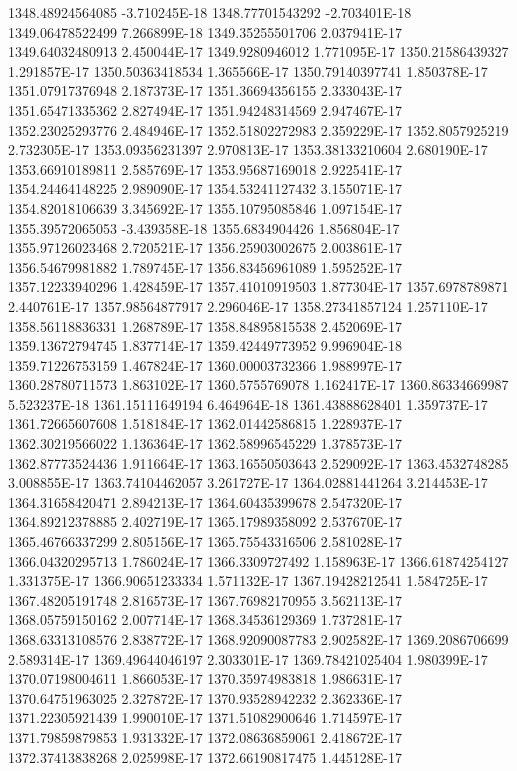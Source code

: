 1348.48924564085  -3.710245E-18
1348.77701543292  -2.703401E-18
1349.06478522499  7.266899E-18
1349.35255501706  2.037941E-17
1349.64032480913  2.450044E-17
1349.9280946012  1.771095E-17
1350.21586439327  1.291857E-17
1350.50363418534  1.365566E-17
1350.79140397741  1.850378E-17
1351.07917376948  2.187373E-17
1351.36694356155  2.333043E-17
1351.65471335362  2.827494E-17
1351.94248314569  2.947467E-17
1352.23025293776  2.484946E-17
1352.51802272983  2.359229E-17
1352.8057925219  2.732305E-17
1353.09356231397  2.970813E-17
1353.38133210604  2.680190E-17
1353.66910189811  2.585769E-17
1353.95687169018  2.922541E-17
1354.24464148225  2.989090E-17
1354.53241127432  3.155071E-17
1354.82018106639  3.345692E-17
1355.10795085846  1.097154E-17
1355.39572065053  -3.439358E-18
1355.6834904426  1.856804E-17
1355.97126023468  2.720521E-17
1356.25903002675  2.003861E-17
1356.54679981882  1.789745E-17
1356.83456961089  1.595252E-17
1357.12233940296  1.428459E-17
1357.41010919503  1.877304E-17
1357.6978789871  2.440761E-17
1357.98564877917  2.296046E-17
1358.27341857124  1.257110E-17
1358.56118836331  1.268789E-17
1358.84895815538  2.452069E-17
1359.13672794745  1.837714E-17
1359.42449773952  9.996904E-18
1359.71226753159  1.467824E-17
1360.00003732366  1.988997E-17
1360.28780711573  1.863102E-17
1360.5755769078  1.162417E-17
1360.86334669987  5.523237E-18
1361.15111649194  6.464964E-18
1361.43888628401  1.359737E-17
1361.72665607608  1.518184E-17
1362.01442586815  1.228937E-17
1362.30219566022  1.136364E-17
1362.58996545229  1.378573E-17
1362.87773524436  1.911664E-17
1363.16550503643  2.529092E-17
1363.4532748285  3.008855E-17
1363.74104462057  3.261727E-17
1364.02881441264  3.214453E-17
1364.31658420471  2.894213E-17
1364.60435399678  2.547320E-17
1364.89212378885  2.402719E-17
1365.17989358092  2.537670E-17
1365.46766337299  2.805156E-17
1365.75543316506  2.581028E-17
1366.04320295713  1.786024E-17
1366.3309727492  1.158963E-17
1366.61874254127  1.331375E-17
1366.90651233334  1.571132E-17
1367.19428212541  1.584725E-17
1367.48205191748  2.816573E-17
1367.76982170955  3.562113E-17
1368.05759150162  2.007714E-17
1368.34536129369  1.737281E-17
1368.63313108576  2.838772E-17
1368.92090087783  2.902582E-17
1369.2086706699  2.589314E-17
1369.49644046197  2.303301E-17
1369.78421025404  1.980399E-17
1370.07198004611  1.866053E-17
1370.35974983818  1.986631E-17
1370.64751963025  2.327872E-17
1370.93528942232  2.362336E-17
1371.22305921439  1.990010E-17
1371.51082900646  1.714597E-17
1371.79859879853  1.931332E-17
1372.08636859061  2.418672E-17
1372.37413838268  2.025998E-17
1372.66190817475  1.445128E-17
